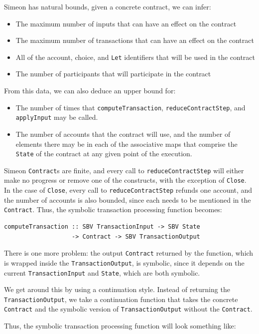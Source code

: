 \documentclass[english,runningheads]{llncs}
\begin{document}
Simeon has natural bounds, given a concrete contract, we can infer:
\begin{itemize}
\item The maximum number of inputs that can have an effect on the contract
\item The maximum number of transactions that can have an effect on the
contract
\item All of the account, choice, and \texttt{Let} identifiers that will
be used in the contract
\item The number of participants that will participate in the contract
\end{itemize}
From this data, we can also deduce an upper bound for:
\begin{itemize}
\item The number of times that
\texttt{computeTransaction}, \texttt{reduceContractStep}, and \texttt{applyInput} may
be called.
\item The number of accounts that the contract will use, and
the number of elements there may be in each of the associative maps
that comprise the \texttt{State} of the contract at any given point
of the execution.
\end{itemize}
Simeon \texttt{Contract}s are finite, and every call to
\texttt{reduceContractStep} will either make no progress or
remove one of the constructs, with the exception of \texttt{Close}.
In the case of \texttt{Close}, every call to \texttt{reduceContractStep} refunds
one account, and the number of accounts is also bounded, since each
needs to be mentioned in the \texttt{Contract}. Thus, the symbolic transaction
processing function becomes:

\begin{verbatim}
computeTransaction :: SBV TransactionInput -> SBV State
                   -> Contract -> SBV TransactionOutput
\end{verbatim}

There is one more problem: the output \texttt{Contract} returned
by the function, which is wrapped inside the \texttt{TransactionOutput},
is symbolic, since it depends on the current \texttt{TransactionInput}
and \texttt{State}, which are both symbolic.

We get around this by using a continuation style. Instead
of returning the \texttt{TransactionOutput}, we take a continuation
function that takes the concrete \texttt{Contract} and the symbolic version
of \texttt{TransactionOutput} without the \texttt{Contract}.

Thus, the symbolic transaction processing function will look something
like:
\end{document}
